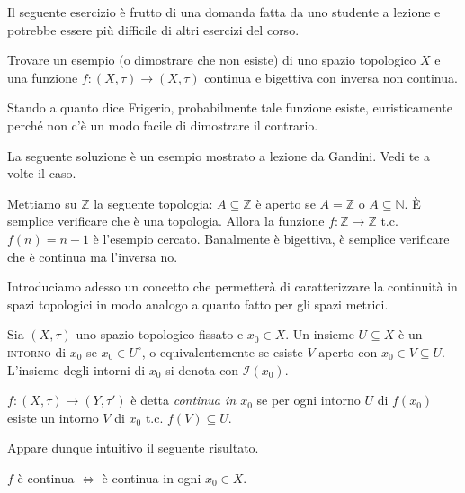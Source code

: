 \begin{exc}
	Il seguente esercizio è frutto di una domanda fatta da uno studente a
	lezione e potrebbe essere più difficile di altri esercizi del corso.

    \marginpar{\warningsign}
	Trovare un esempio (o dimostrare che non esiste) di uno spazio topologico
	$X$ e una funzione $f: (X, \tau) \rightarrow (X, \tau)$ continua e bigettiva
	con inversa non continua.

    Stando a quanto dice Frigerio, probabilmente tale funzione esiste,
    euristicamente perché non c'è un modo facile di dimostrare il contrario.
\end{exc}

\begin{sol}
	La seguente soluzione è un esempio mostrato a lezione da Gandini. Vedi te a
	volte il caso.

	Mettiamo su $\mathbb{Z}$ la seguente topologia: $A \subseteq \mathbb{Z}$ è
	aperto se $A=\mathbb{Z}$ o $A \subseteq \mathbb{N}$. È semplice verificare
	che è una topologia. Allora la funzione $f: \mathbb{Z} \rightarrow
	\mathbb{Z}$ t.c. $f(n)=n-1$ è l'esempio cercato. Banalmente è bigettiva, è
	semplice verificare che è continua ma l'inversa no.
\end{sol}

Introduciamo adesso un concetto che permetterà di caratterizzare la continuità
in spazi topologici in modo analogo a quanto fatto per gli spazi metrici.

\begin{defn}
	Sia $(X, \tau)$ uno spazio topologico fissato e $x_0 \in X$. Un insieme $U
	\subseteq X$ è un \textsc{intorno} di $x_0$ se $x_0 \in
	U^{\circ}$, o equivalentemente se esiste $V$ aperto con $x_0 \in V
	\subseteq U$. L'insieme degli intorni di $x_0$ si denota con
	$\mathcal{I}(x_0)$.
\end{defn}

\begin{defn}
	$f:(X, \tau) \rightarrow (Y, \tau')$ è detta \textit{continua in $x_0$} se
	per ogni intorno $U$ di $f(x_0)$ esiste un intorno $V$ di $x_0$ t.c. $f(V)
	\subseteq U$.
\end{defn}

Appare dunque intuitivo il seguente risultato.

\begin{thm}
	$f$ è continua $\Leftrightarrow$ è continua in ogni $x_0 \in X$.
\end{thm}


